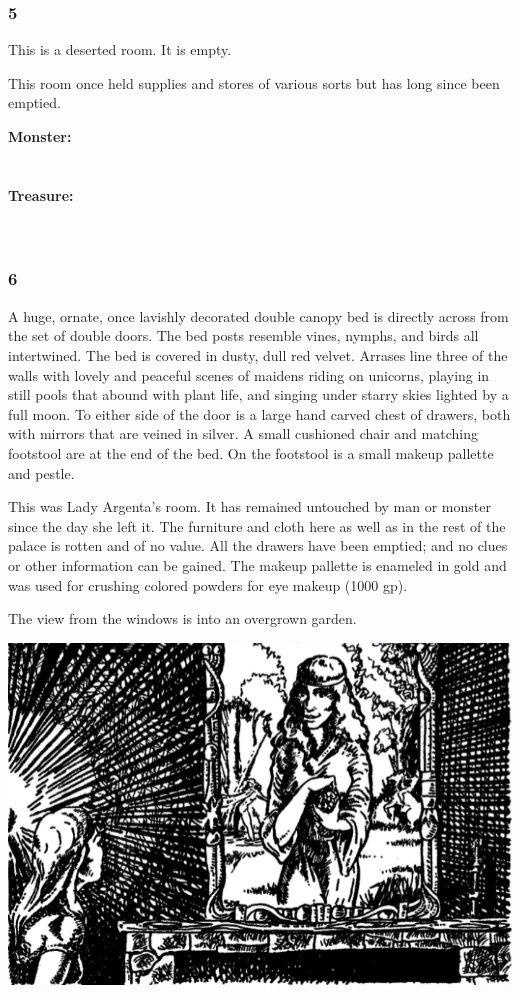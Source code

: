 \documentclass[palace_of_the_silver_princess]{subfiles}
\begin{document}
\subsubsection{5}
\begin{quotebox}
    This is a deserted room. It is empty.
\end{quotebox}

This room once held supplies and stores of various sorts but has long
since been emptied.

\textbf{Monster:}
\\
\\
\\
\textbf{Treasure:}
\\
\\
\\

\subsubsection{6}
\begin{quotebox}
    A huge, ornate, once lavishly decorated double canopy bed is
    directly across from the set of double doors. The bed posts
    resemble vines, nymphs, and birds all intertwined. The bed is
    covered in dusty, dull red velvet. Arrases line three of the walls
    with lovely and peaceful scenes of maidens riding on unicorns,
    playing in still pools that abound with plant life, and singing
    under starry skies lighted by a full moon. To either side of the
    door is a large hand carved chest of drawers, both with mirrors that
    are veined in silver. A small cushioned chair and matching footstool
    are at the end of the bed. On the footstool is a small makeup
    pallette and pestle.
\end{quotebox}

This was Lady Argenta’s room. It has remained untouched by man or
monster since the day she left it. The furniture and cloth here as well
as in the rest of the palace is rotten and of no value. All the drawers
have been emptied; and no clues or other information can be gained. The
makeup pallette is enameled in gold and was used for crushing colored
powders for eye makeup (1000 gp).

The view from the windows is into an overgrown garden.

\includegraphics[width=\columnwidth]{img/lady.png}
\end{document}
